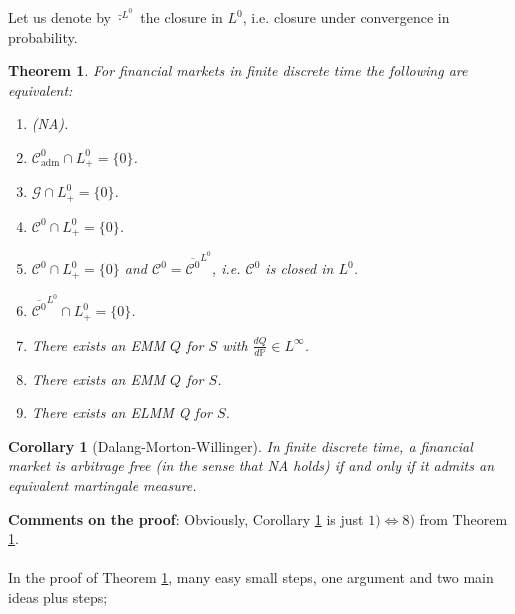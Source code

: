 \documentclass[12pt,a4paper, twoside]{article}
\newtheorem{thm}{Theorem}[section]
\newtheorem{cor}{Corollary}[section]
\theoremstyle{definition}
\newcommand{\PP}{\mathbb{P}} %
\begin{document}
Let us denote by $\bar{\cdot}^{L^0}$ the closure in $L^0$, i.e. closure under convergence in probability. 
\newpage
\begin{thm} \label{T12} For financial markets in finite discrete time the following are equivalent:
\begin{enumerate}
\item (NA).
\item $\mathcal{C}_\text{adm}^0 \cap L_+^0 = \{0\}$.
\item $\mathcal{G} \cap L_+^0 = \{0\}$.
\item $\mathcal{C}^0 \cap L_+^0 = \{0 \}$.
\item $\mathcal{C}^0 \cap L_+^0 = \{0\}$ and $\mathcal{C}^0 = \overline{\mathcal{C}^0}^{L^0}$, i.e. $\mathcal{C}^0$ is closed in $L^0$. 
\item $\overline{\mathcal{C}^0}^{L^0} \cap L_+^0 = \{0\}$.
\item There exists an EMM $Q$ for $S$ with $\frac{dQ}{d \PP} \in L^\infty$.
\item There exists an EMM $Q$ for $S$.
\item There exists an ELMM Q for $S$.
\end{enumerate}
\end{thm}
\begin{cor}[Dalang-Morton-Willinger] \label{C13} In finite discrete time, a financial market is arbitrage free (in the sense that NA holds) if and only if it admits an equivalent martingale measure. 
\end{cor}
\noindent \textbf{Comments on the proof}: Obviously, Corollary \ref{C13} is just $1) \iff 8)$ from Theorem \ref{T12}. \\
\\
In the proof of Theorem \ref{T12}, many easy small steps, one argument and two main ideas plus steps;
\end{document}
